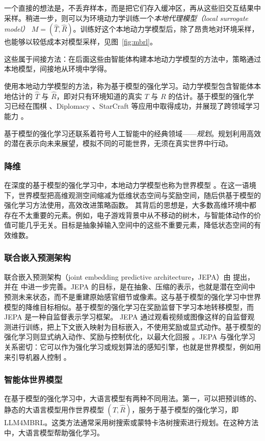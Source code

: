 一个直接的想法是，不丢弃样本，而是把它们存入缓冲区，再从这些旧交互结果中采样。稍进一步，则可以为环境动力学训练一个{\em 本地代理模型（local surrogate model）} $M=(\hat{T}, \hat{R})$。训练好这个本地动力学模型后，除了昂贵地对环境采样，也能够以较低成本对模型采样，见图~\ref{fig:mbrl}。

这些属于间接方法：在后面这些由智能体构建本地动力学模型的方法中，策略通过本地模型，间接地从环境中学得。

使用本地动力学模型的方法，称为基于模型的强化学习。动力学模型包含智能体本地估计的 $\hat{T}$ 与 $\hat{R}$，即对只有环境知道的真实 $T$ 与 $R$ 的估计。基于模型的强化学习已经在围棋 \citep{silver2016mastering}、Diplomacy \citep{meta2022human}、StarCraft \citep{vinyals2019grandmaster} 等应用中取得成功，并展现了跨领域学习能力 \citep{hafner2020mastering}。

基于模型的强化学习还联系着符号人工智能中的经典领域——{\em 规划}。规划利用高效的潜在表示向未来展望，模拟不同的可能世界，无须在真实世界中行动。

\subsubsection{降维}
在深度的基于模型的强化学习中，本地动力学模型也称为世界模型 \citep{ha2018world}。在这一语境下，世界模型把高维观测空间缩减为低维状态空间与奖励空间，随后供基于模型的强化学习方法使用，高效改进策略函数。
其背后的思想是，大多数高维环境中都存在不太重要的元素。例如，电子游戏背景中从不移动的树木，与智能体动作的价值可能几乎无关。目标是抽象掉输入空间中的这些不重要元素，降低状态空间的有效维数。

\subsubsection{联合嵌入预测架构}
联合嵌入预测架构（joint embedding predictive architecture，JEPA）由 \citet{lecun2022path} 提出，并在 \citet{assran2023self} 中进一步完善。JEPA 的目标，是在抽象、压缩的表示，也就是潜在空间中预测未来状态，而不是重建原始感官细节或像素。这与基于模型的强化学习中世界模型的降维目标相似。基于模型的强化学习在奖励监督下学习本地转移模型，而 JEPA 是一种自监督表示学习框架。
JEPA 通过观看视频或图像这样的自监督观测进行训练，把上下文嵌入映射为目标嵌入，不使用奖励或显式动作。基于模型的强化学习则显式纳入动作、奖励与控制优化，以最大化回报 \citep{lim2026jedi}。JEPA 与强化学习关系密切：它可以作为强化学习或规划算法的感知引擎，也就是世界模型，例如用来引导机器人控制 \citep{destrade2025value}。

\subsubsection{智能体世界模型}
在基于模型的强化学习中，大语言模型有两种不同用法。第一，可以把预训练的、静态的大语言模型用作世界模型 $(\hat{T}, \hat{R})$，服务于基于模型的强化学习，即 LLM4MBRL。这类方法通常采用树搜索或蒙特卡洛树搜索进行规划。在这种方法中，大语言模型帮助强化学习。

